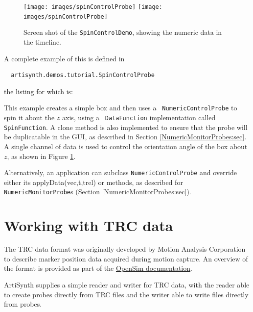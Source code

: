 \begin{figure}[ht]
\begin{center}
\iflatexml
 \texttt{[image: images/spinControlProbe]}
\else
 \texttt{[image: images/spinControlProbe]}
\fi
\end{center}
\caption{Screen shot of the {\tt SpinControlDemo}, showing the
numeric data in the timeline.}
\label{spinControlProbe:fig}
\end{figure}

A complete example
of this is defined in
%
\begin{verbatim}
  artisynth.demos.tutorial.SpinControlProbe
\end{verbatim}
%
the listing for which is:

\lstset{numbers=left}

\lstset{numbers=none}

This example creates a simple box and then uses a {\tt
NumericControlProbe} to spin it about the $z$ axis, using a {\tt
DataFunction} implementation called {\tt SpinFunction}. A clone method
is also implemented to ensure that the probe will be duplicatable in
the GUI, as described in Section \ref{NumericMonitorProbes:sec}.  A
single channel of data is used to control the orientation angle of the
box about $z$, as shown in Figure \ref{spinControlProbe:fig}.

Alternatively, an application can subclass {\tt NumericControlProbe}
and override either its %
{applyData(vec,t,trel)} or 
methods, as described for {\tt NumericMonitorProbe}s (Section
\ref{NumericMonitorProbes:sec}).

\section{Working with TRC data}
\label{TRCData:sec}

The TRC data format was originally developed by Motion Analysis Corporation to
describe marker position data acquired during motion capture. An overview of
the format is provided as part of the
\href{https://opensimconfluence.atlassian.net/wiki/spaces/OpenSim/pages/53089972/Marker+.trc+Files}{OpenSim
documentation}.

ArtiSynth supplies a simple reader and writer for TRC data, with the reader
able to create probes directly from TRC files and the writer able to write
files directly from probes.

